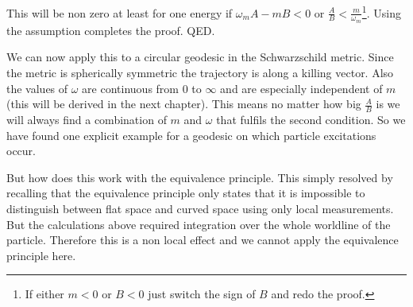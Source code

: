 This will be non zero at least for one energy if \(\omega_m A - m B < 0\) or \(\frac{A}{B} < \frac{m}{\omega_m}\)\footnote{If either \(m < 0\) or \(B < 0\) just switch the sign of \(B\) and redo the proof.}. Using the assumption completes the proof. QED.

We can now apply this to a circular geodesic in the Schwarzschild metric. Since the metric is spherically symmetric the trajectory is along a killing vector. Also the values of \(\omega\) are continuous from \(0\) to \(\infty\) and are especially independent of \(m\) (this will be derived in the next chapter). This means no matter how big \(\frac{A}{B}\) is we will always find a combination of \(m\) and \(\omega\) that fulfils the second condition. So we have found one explicit example for a geodesic on which particle excitations occur.  

But how does this work with the equivalence principle. This simply resolved by recalling that the equivalence principle only states that it is impossible to distinguish between flat space and curved space using only local measurements. But the calculations above required integration over the whole worldline of the particle. Therefore this is a non local effect and we cannot apply the equivalence principle here. 
